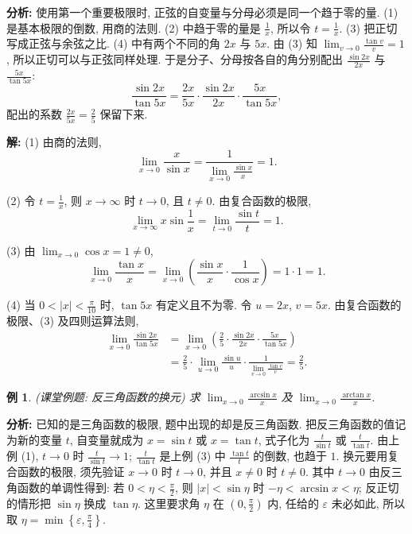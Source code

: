 \documentclass[UTF8,openany]{ctexbook}
\theoremstyle{chinesetextbook}
\newtheorem{example}{例}[section]
\newenvironment{cnsolution}{\par\indent\textbf{解:} \ignorespaces}{\par}
\begin{document}
\par\indent\textbf{分析:} 使用第一个重要极限时, 正弦的自变量与分母必须是同一个趋于零的量. (1) 是基本极限的倒数, 用商的法则. (2) 中趋于零的量是 $\displaystyle\frac1x$, 所以令 $\displaystyle t=\frac1x$. (3) 把正切写成正弦与余弦之比. (4) 中有两个不同的角 $2x$ 与 $5x$. 由 (3) 知 $\displaystyle\lim_{v\to0}\frac{\tan v}v=1$, 所以正切可以与正弦同样处理. 于是分子、分母按各自的角分别配出 $\displaystyle\frac{\sin2x}{2x}$ 与 $\displaystyle\frac{5x}{\tan5x}$:
\[
\frac{\sin2x}{\tan5x}=\frac{2x}{5x}\cdot\frac{\sin2x}{2x}\cdot\frac{5x}{\tan5x},
\]
配出的系数 $\displaystyle\frac{2x}{5x}=\frac25$ 保留下来.
\begin{cnsolution}
(1) 由商的法则,
\[
\lim_{x\to0}\frac x{\sin x}=\frac1{\displaystyle\lim_{x\to0}\frac{\sin x}x}=1.
\]

(2) 令 $\displaystyle t=\frac1x$, 则 $x\to\infty$ 时 $t\to0$, 且 $t\ne0$. 由复合函数的极限,
\[
\lim_{x\to\infty}x\sin\frac1x=\lim_{t\to0}\frac{\sin t}t=1.
\]

(3) 由 $\displaystyle\lim_{x\to0}\cos x=1\ne0$,
\[
\lim_{x\to0}\frac{\tan x}x=\lim_{x\to0}\left(\frac{\sin x}x\cdot\frac1{\cos x}\right)=1\cdot1=1.
\]

(4) 当 $\displaystyle0<|x|<\frac\pi{10}$ 时, $\tan5x$ 有定义且不为零. 令 $u=2x$, $v=5x$. 由复合函数的极限、(3) 及四则运算法则,
\[
\begin{aligned}
\lim_{x\to0}\frac{\sin2x}{\tan5x}
&=\lim_{x\to0}\left(\frac25\cdot\frac{\sin2x}{2x}\cdot\frac{5x}{\tan5x}\right)\\
&=\frac25\cdot\lim_{u\to0}\frac{\sin u}u\cdot\frac1{\displaystyle\lim_{v\to0}\frac{\tan v}v}=\frac25.
\end{aligned}
\]
\end{cnsolution}
\begin{example}
\textnormal{(课堂例题: 反三角函数的换元)} 求 $\displaystyle\lim_{x\to0}\frac{\arcsin x}x$ 及 $\displaystyle\lim_{x\to0}\frac{\arctan x}x$.
\end{example}
\par\indent\textbf{分析:} 已知的是三角函数的极限, 题中出现的却是反三角函数. 把反三角函数的值记为新的变量 $t$, 自变量就成为 $x=\sin t$ 或 $x=\tan t$, 式子化为 $\displaystyle\frac t{\sin t}$ 或 $\displaystyle\frac t{\tan t}$. 由上例 (1), $t\to0$ 时 $\displaystyle\frac t{\sin t}\to1$; $\displaystyle\frac t{\tan t}$ 是上例 (3) 中 $\displaystyle\frac{\tan t}t$ 的倒数, 也趋于 $1$. 换元要用复合函数的极限, 须先验证 $x\to0$ 时 $t\to0$, 并且 $x\ne0$ 时 $t\ne0$. 其中 $t\to0$ 由反三角函数的单调性得到: 若 $\displaystyle0<\eta<\frac\pi2$, 则 $|x|<\sin\eta$ 时 $-\eta<\arcsin x<\eta$; 反正切的情形把 $\sin\eta$ 换成 $\tan\eta$. 这里要求角 $\eta$ 在 $\displaystyle\left(0,\frac\pi2\right)$ 内, 任给的 $\varepsilon$ 未必如此, 所以取 $\displaystyle\eta=\min\left\{\varepsilon,\frac\pi4\right\}$.
\end{document}
